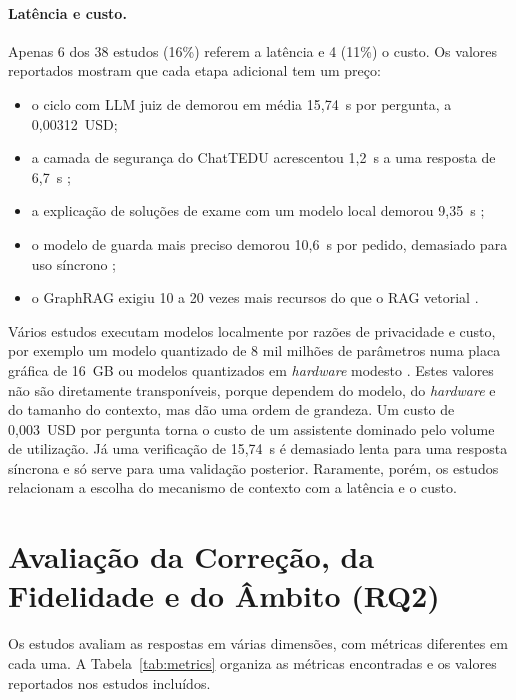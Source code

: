 \paragraph{Latência e custo.} Apenas 6 dos 38 estudos (16\%) referem a latência e 4 (11\%) o custo. Os valores reportados mostram que cada etapa adicional tem um preço:
\begin{itemize}
    \item o ciclo com \gls{LLM} juiz de \textcite{bellard2025development} demorou em média 15,74~s por pergunta, a 0,00312~USD;
    \item a camada de segurança do ChatTEDU acrescentou 1,2~s a uma resposta de 6,7~s \parencite{emekci2025securing};
    \item a explicação de soluções de exame com um modelo local demorou 9,35~s \parencite{khan2025towards};
    \item o modelo de guarda mais preciso demorou 10,6~s por pedido, demasiado para uso síncrono \parencite{walczak2026comparative};
    \item o GraphRAG exigiu 10 a 20 vezes mais recursos do que o \gls{RAG} vetorial \parencite{jain2025aligning}.
\end{itemize} Vários estudos executam modelos localmente por razões de privacidade e custo, por exemplo um modelo quantizado de 8 mil milhões de parâmetros numa placa gráfica de 16~GB \parencite{sayeed2026tutor} ou modelos quantizados em \emph{hardware} modesto \parencite{ruga2025conversational,nurfadhilah2025retrieval}. Estes valores não são diretamente transponíveis, porque dependem do modelo, do \emph{hardware} e do tamanho do contexto, mas dão uma ordem de grandeza. Um custo de 0,003~USD por pergunta torna o custo de um assistente dominado pelo volume de utilização. Já uma verificação de 15,74~s é demasiado lenta para uma resposta síncrona e só serve para uma validação posterior. Raramente, porém, os estudos relacionam a escolha do mecanismo de contexto com a latência e o custo.

\section{Avaliação da Correção, da Fidelidade e do Âmbito (RQ2)}
\label{sec:chap2_syn_eval}

Os estudos avaliam as respostas em várias dimensões, com métricas diferentes em cada uma. A Tabela~\ref{tab:metrics} organiza as métricas encontradas e os valores reportados nos estudos incluídos.

